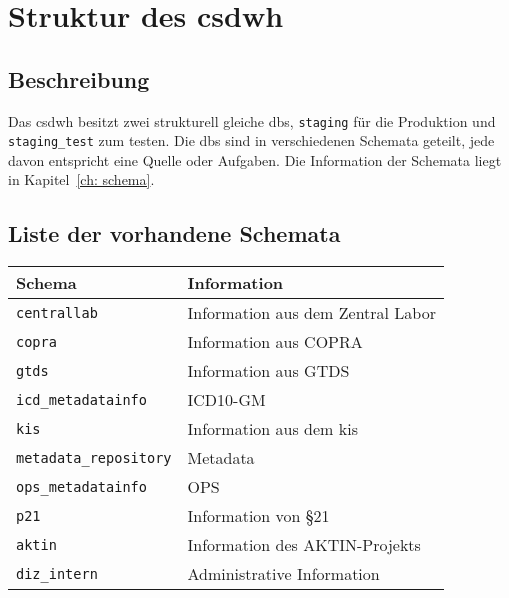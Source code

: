  \chapter{Struktur des \acs{csdwh}}
 \label{ch:strcsdwh} 
    \section{Beschreibung}
    Das \ac{csdwh} besitzt zwei strukturell gleiche \acp{db}, \texttt{staging} für die Produktion und \texttt{staging\_test} zum testen. Die \acp{db} sind in verschiedenen Schemata geteilt, jede davon entspricht eine Quelle oder Aufgaben. Die Information der Schemata liegt in Kapitel~\ref{ch: schema}.
    
    \section{Liste der vorhandene Schemata}
    
    \begin{center}
    	\begin{tabular}{|| l | l ||} 
    		\hline
    		Schema & Information \\ [0.5ex] 
    		\hline\hline
    		\texttt{centrallab} & Information aus dem Zentral Labor \\ 
    		\hline
    		\texttt{copra} & Information aus COPRA \\
    		\hline
    		\texttt{gtds} & Information aus GTDS  \\
    		\hline
    		\texttt{icd\_metadatainfo} & ICD10-GM  \\
    		\hline
    		\texttt{kis} & Information aus dem \ac{kis}  \\ [1ex] 
    		\hline
        	\texttt{metadata\_repository} & Metadata \\
        	\hline 
        	\texttt{ops\_metadatainfo} & OPS  \\
        	\hline
        	\texttt{p21} & Information von \S 21  \\ 
        	\hline
        	\texttt{aktin} & Information des AKTIN-Projekts\\
        	\hline
        	\texttt{diz\_intern} & Administrative Information\\
        	\hline
    	\end{tabular}
    \end{center}
